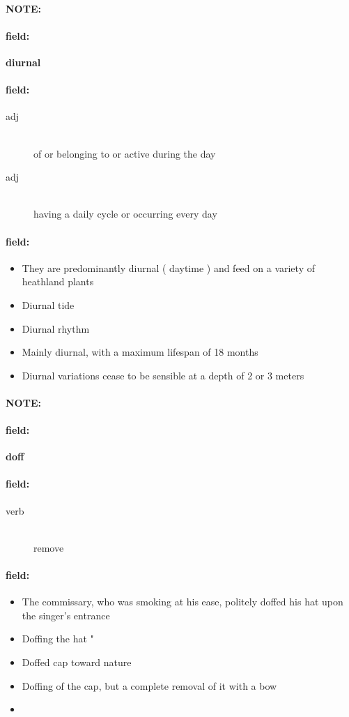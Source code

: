 \documentclass[12pt]{article}
\newenvironment{note}{\paragraph{NOTE:}}{}
\newenvironment{field}{\paragraph{field:}}{}
\begin{document}
\begin{note}
\begin{field}
\textbf{\large diurnal}
\end{field}


\begin{field}
\begin{description}
\item[adj] \hfill \\ 
of or belonging to or active during the day

\item[adj] \hfill \\ 
having a daily cycle or occurring every day

\end{description}
\end{field}

\begin{field}
\begin{itemize}
\item They are predominantly diurnal ( daytime ) and feed on a variety of heathland plants
\item Diurnal tide
\item Diurnal rhythm
\item Mainly diurnal, with a maximum lifespan of 18 months
\item Diurnal variations cease to be sensible at a depth of 2 or 3 meters
\end{itemize}
\end{field}
\end{note}
\begin{note}
\begin{field}
\textbf{\large doff}
\end{field}


\begin{field}
\begin{description}
\item[verb] \hfill \\ 
remove

\end{description}
\end{field}

\begin{field}
\begin{itemize}
\item The commissary, who was smoking at his ease, politely doffed his hat upon the singer's entrance
\item Doffing the hat " 
\item Doffed cap toward nature
\item Doffing of the cap, but a complete removal of it with a bow
\item 
\end{itemize}
\end{field}
\end{note}
\end{document}
